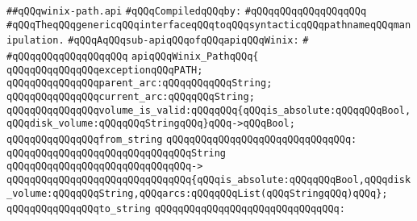 \label{src/lib/std/src/winix/winix-path.api}
\verb|##qQQqwinix-path.api|\newline
\newline
\verb|#qQQqCompiledqQQqby:|\newline
\verb|#qQQqqQQqqQQqqQQqqQQq|\newline
\newline
\newline
\newline
\verb|#qQQqTheqQQqgenericqQQqinterfaceqQQqtoqQQqsyntacticqQQqpathnameqQQqmanipulation.|\newline
\verb|#qQQqAqQQqsub-apiqQQqofqQQqapiqQQqWinix:|\newline
\verb|#|\newline
\verb|#qQQqqQQqqQQqqQQqqQQq|\newline
\newline
\verb|apiqQQqWinix_PathqQQq{|\newline
\newline
\verb|qQQqqQQqqQQqqQQqexceptionqQQqPATH;|\newline
\newline
\verb|qQQqqQQqqQQqqQQqparent_arc:qQQqqQQqqQQqString;|\newline
\verb|qQQqqQQqqQQqqQQqcurrent_arc:qQQqqQQqString;|\newline
\newline
\verb|qQQqqQQqqQQqqQQqvolume_is_valid:qQQqqQQq{qQQqis_absolute:qQQqqQQqBool,qQQqdisk_volume:qQQqqQQqStringqQQq}qQQq->qQQqBool;|\newline
\newline
\verb|qQQqqQQqqQQqqQQqfrom_string|\newline
\verb|qQQqqQQqqQQqqQQqqQQqqQQqqQQqqQQq:|\newline
\verb|qQQqqQQqqQQqqQQqqQQqqQQqqQQqqQQqString|\newline
\verb|qQQqqQQqqQQqqQQqqQQqqQQqqQQqqQQq->|\newline
\verb|qQQqqQQqqQQqqQQqqQQqqQQqqQQqqQQq{qQQqis_absolute:qQQqqQQqBool,qQQqdisk_volume:qQQqqQQqString,qQQqarcs:qQQqqQQqList(qQQqStringqQQq)qQQq};|\newline
\newline
\newline
\verb|qQQqqQQqqQQqqQQqto_string|\newline
\verb|qQQqqQQqqQQqqQQqqQQqqQQqqQQqqQQq:|\newline
